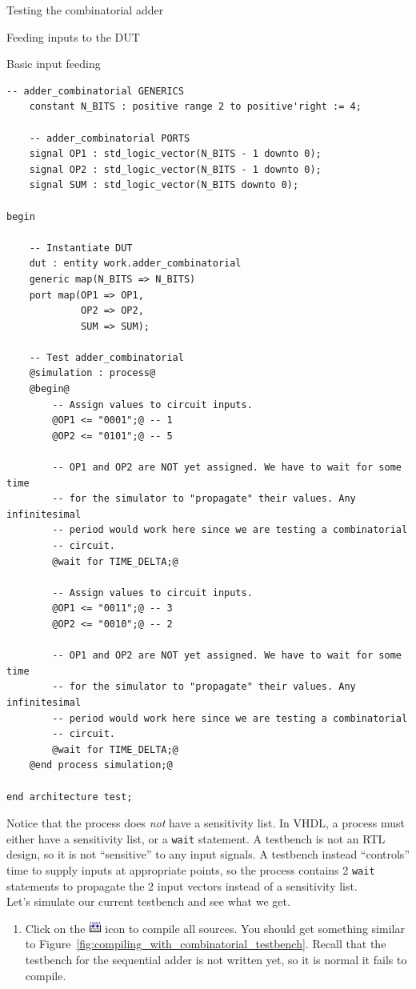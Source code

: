 \documentclass[lab]{course}
\begin{document}
\begin{section}{Testing the combinatorial adder}
\begin{subsection}{Feeding inputs to the DUT}
\begin{subsubsection}{Basic input feeding}
\begin{lstlisting}[caption={Simulation process (basic)}, label={lst:combinatorial_simulation_process_1_test_vector}]
    -- adder_combinatorial GENERICS
    constant N_BITS : positive range 2 to positive'right := 4;

    -- adder_combinatorial PORTS
    signal OP1 : std_logic_vector(N_BITS - 1 downto 0);
    signal OP2 : std_logic_vector(N_BITS - 1 downto 0);
    signal SUM : std_logic_vector(N_BITS downto 0);

begin

    -- Instantiate DUT
    dut : entity work.adder_combinatorial
    generic map(N_BITS => N_BITS)
    port map(OP1 => OP1,
             OP2 => OP2,
             SUM => SUM);

    -- Test adder_combinatorial
    @simulation : process@
    @begin@
        -- Assign values to circuit inputs.
        @OP1 <= "0001";@ -- 1
        @OP2 <= "0101";@ -- 5

        -- OP1 and OP2 are NOT yet assigned. We have to wait for some time
        -- for the simulator to "propagate" their values. Any infinitesimal
        -- period would work here since we are testing a combinatorial
        -- circuit.
        @wait for TIME_DELTA;@

        -- Assign values to circuit inputs.
        @OP1 <= "0011";@ -- 3
        @OP2 <= "0010";@ -- 2

        -- OP1 and OP2 are NOT yet assigned. We have to wait for some time
        -- for the simulator to "propagate" their values. Any infinitesimal
        -- period would work here since we are testing a combinatorial
        -- circuit.
        @wait for TIME_DELTA;@
    @end process simulation;@

end architecture test;
            \end{lstlisting}
        \end{subsubsection}

        Notice that the process does \emph{not} have a sensitivity list. In VHDL, a process must either have a sensitivity list, or a \verb+wait+ statement. A testbench is not an RTL design, so it is not ``sensitive'' to any input signals. A testbench instead ``controls'' time to supply inputs at appropriate points, so the process contains 2 \verb+wait+ statements to propagate the 2 input vectors instead of a sensitivity list. \\

        Let's simulate our current testbench and see what we get.

        \begin{enumerate}
            \item Click on the \includegraphics[height=11pt]{figs/compile_all_icon.png} icon to compile all sources. You should get something similar to Figure~\ref{fig:compiling_with_combinatorial_testbench}. Recall that the testbench for the sequential adder is not written yet, so it is normal it fails to compile.


\end{enumerate}
\end{subsection}
\end{section}
\end{document}
